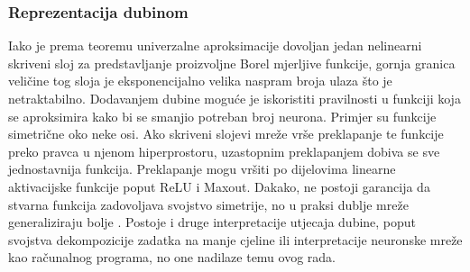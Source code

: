 \documentclass[times, utf8, numeric, diplomski]{fer}
\def\TODO#1{\noindent\textcolor{red}{TODO: \textit{#1}}\newline}
\def\todo#1{\TODO{#1}}
\begin{document}
\subsubsection{Reprezentacija dubinom}
Iako je prema teoremu univerzalne aproksimacije dovoljan jedan nelinearni skriveni sloj za predstavljanje proizvoljne Borel mjerljive funkcije, gornja granica veličine tog sloja je eksponencijalno velika naspram broja ulaza što je netraktabilno. Dodavanjem dubine moguće je iskoristiti pravilnosti u funkciji koja se aproksimira kako bi se smanjio potreban broj neurona. Primjer su funkcije simetrične oko neke osi. Ako skriveni slojevi mreže vrše preklapanje te funkcije preko pravca u njenom hiperprostoru, uzastopnim preklapanjem dobiva se sve jednostavnija funkcija. Preklapanje mogu vršiti po dijelovima linearne aktivacijske funkcije poput ReLU i Maxout. Dakako, ne postoji garancija da stvarna funkcija zadovoljava svojstvo simetrije, no u praksi dublje mreže generaliziraju bolje \citep{alexnet, highwaynet, resnet, densenet}. Postoje i druge interpretacije utjecaja dubine, poput svojstva dekompozicije zadatka na manje cjeline ili interpretacije neuronske mreže kao računalnog programa, no one nadilaze temu ovog rada. \citep[poglavlje~6.4.1]{goodfellowbook}

%

%
\end{document}
